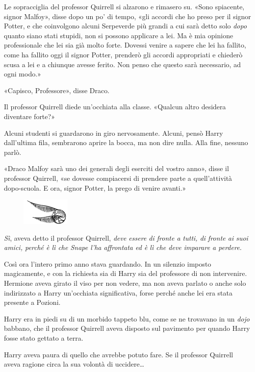 Le sopracciglia del professor Quirrell si alzarono e rimasero su. «Sono spiacente, signor Malfoy», disse dopo un po’ di tempo, «gli accordi che ho preso per il signor Potter, e che coinvolgono alcuni Serpeverde più grandi a cui sarà detto solo \textit{dopo} quanto siano stati stupidi, non si possono applicare a lei. Ma è mia opinione professionale che lei sia già molto forte. Dovessi venire a sapere che lei ha fallito, come ha fallito oggi il signor Potter, prenderò gli accordi appropriati e chiederò scusa a lei e a chiunque avesse ferito. Non penso che questo sarà necessario, ad ogni modo.»

«Capisco, Professore», disse Draco.

Il professor Quirrell diede un’occhiata alla classe. «Qualcun altro desidera diventare forte?»

Alcuni studenti si guardarono in giro nervosamente. Alcuni, pensò Harry dall’ultima fila, sembrarono aprire la bocca, ma non dire nulla. Alla fine, nessuno parlò.

«Draco Malfoy sarà uno dei generali degli eserciti del vostro anno», disse il professor Quirrell, «se dovesse compiacersi di prendere parte a quell’attività dopo-scuola. E ora, signor Potter, la prego di venire avanti.»

\begin{figure}[h!]
        \includegraphics[scale=0.4]{boccino.png}
        \centering
\end{figure}

\textit{Sì}, aveva detto il professor Quirrell, \textit{deve essere di fronte a tutti, di fronte ai suoi amici, perché è lì che Snape l’ha affrontata ed è lì che deve imparare a perdere.}

Così ora l’intero primo anno stava guardando. In un silenzio imposto magicamente, e con la richiesta sia di Harry sia del professore di non intervenire. Hermione aveva girato il viso per non vedere, ma non aveva parlato o anche solo indirizzato a Harry un’occhiata significativa, forse perché anche lei era stata presente a Pozioni.

Harry era in piedi su di un morbido tappeto blu, come se ne trovavano in un \textit{dojo} babbano, che il professor Quirrell aveva disposto sul pavimento per quando Harry fosse stato gettato a terra.

Harry aveva paura di quello che avrebbe potuto fare. Se il professor Quirrell aveva ragione circa la sua volontà di uccidere…

